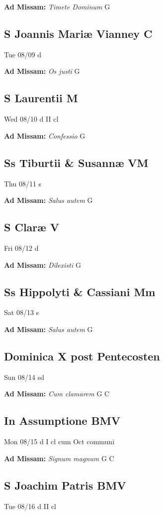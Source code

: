 \documentclass[letterpaper, 10pt, twocolumn]{article}
\begin{document}
\textbf{Ad Missam:} \textit{Timete Dominum} G 

\subsection*{S Joannis Mariæ Vianney C}Tue 08/09 d

\textbf{Ad Missam:} \textit{Os justi} G 

\subsection*{S Laurentii M}Wed 08/10 d II cl

\textbf{Ad Missam:} \textit{Confessio} G 

\subsection*{Ss Tiburtii \& Susannæ VM}Thu 08/11 s

\textbf{Ad Missam:} \textit{Salus autem} G 

\subsection*{S Claræ V}Fri 08/12 d

\textbf{Ad Missam:} \textit{Dilexisti} G 

\subsection*{Ss Hippolyti \& Cassiani Mm}Sat 08/13 s

\textbf{Ad Missam:} \textit{Salus autem} G 

\subsection*{Dominica X post Pentecosten}Sun 08/14 sd

\textbf{Ad Missam:} \textit{Cum clamarem} G C 

\subsection*{In Assumptione BMV}Mon 08/15 d I cl cum Oct communi

\textbf{Ad Missam:} \textit{Signum magnum} G C 

\subsection*{S Joachim Patris BMV}Tue 08/16 d II cl
\end{document}
